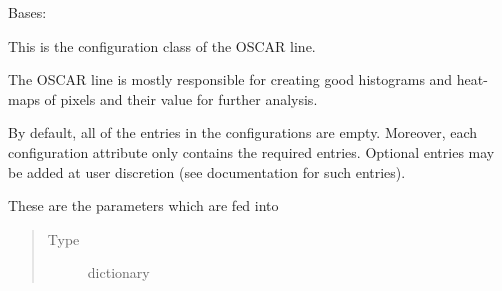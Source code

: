 \documentclass[letterpaper,10pt,english]{sphinxmanual}
\begin{document}
\begin{fulllineitems}
\label{\detokenize{python_docstrings/IfA_Smeargle.yankee.configuration_classes.OscarConfig_file:IfA_Smeargle.yankee.configuration_classes.OscarConfig_file.OscarConfig}}
Bases: {\hyperref[\detokenize{python_docstrings/IfA_Smeargle.yankee.configuration_classes.BaseConfig_file:IfA_Smeargle.yankee.configuration_classes.BaseConfig_file.BaseConfig}]{}}

This is the configuration class of the OSCAR line.

The OSCAR line is mostly responsible for creating good histograms and
heat-maps of pixels and their value for further analysis.

By default, all of the entries in the configurations are empty. Moreover,
each configuration attribute only contains the required entries. Optional
entries may be added at user discretion (see documentation for such
entries).

\begin{fulllineitems}
\label{\detokenize{python_docstrings/IfA_Smeargle.yankee.configuration_classes.OscarConfig_file:IfA_Smeargle.yankee.configuration_classes.OscarConfig_file.OscarConfig.heatmap_config}}
These are the parameters which are fed into
\begin{quote}\begin{description}
\item[{Type}] \leavevmode
dictionary

\end{description}\end{quote}

\end{fulllineitems}



\end{fulllineitems}
\end{document}
